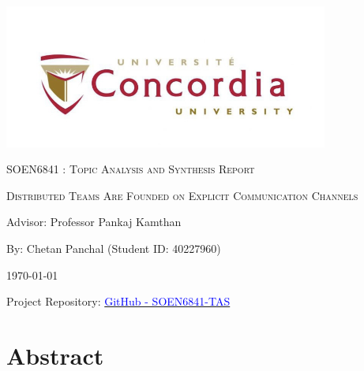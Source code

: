 \documentclass[12pt]{article}
\begin{document}
\begin{titlepage}
    \centering
    \includegraphics[width=0.8\textwidth]{image.jpeg}\par %
     \vspace{2cm}
    {\scshape\Large SOEN6841 : Topic Analysis and Synthesis Report \par}
    \vspace{1.5cm}
    {\scshape\Huge Distributed Teams Are Founded on Explicit
Communication Channels\par}
    \vspace{1.5cm}
    \vspace{1.5cm}
    {\large Advisor: Professor Pankaj Kamthan\par}
    \vspace{1.5cm}
    {\large By: Chetan Panchal (Student ID: 40227960)\par}
    \vspace{1cm}
    {\large \today\par}
    \vspace{1.5cm} %
    {Project Repository: \href{https://github.com/chetanpanchal27/SOEN6841-TAS}{\textcolor{blue}{GitHub - SOEN6841-TAS}}\par}
\end{titlepage}

\tableofcontents
\newpage

\section*{Abstract}
\end{document}
